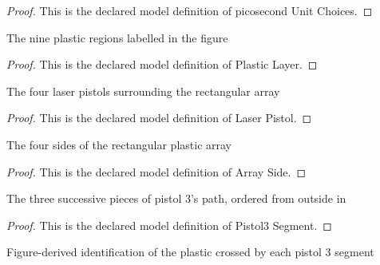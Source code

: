 \begin{proof}
  This is the declared model definition of picosecond Unit Choices.
\end{proof}
\begin{definition}
  \label{def:physics:phyx-mini-0085:phyxminiproblems-problemphyxmini0085-plasticlayer}
  The nine plastic regions labelled in the figure
\end{definition}
\begin{proof}
  This is the declared model definition of Plastic Layer.
\end{proof}
\begin{definition}
  \label{def:physics:phyx-mini-0085:phyxminiproblems-problemphyxmini0085-laserpistol}
  The four laser pistols surrounding the rectangular array
\end{definition}
\begin{proof}
  This is the declared model definition of Laser Pistol.
\end{proof}
\begin{definition}
  \label{def:physics:phyx-mini-0085:phyxminiproblems-problemphyxmini0085-arrayside}
  The four sides of the rectangular plastic array
\end{definition}
\begin{proof}
  This is the declared model definition of Array Side.
\end{proof}
\begin{definition}
  \label{def:physics:phyx-mini-0085:phyxminiproblems-problemphyxmini0085-pistol3segment}
  The three successive pieces of pistol 3's path, ordered from outside in
\end{definition}
\begin{proof}
  This is the declared model definition of Pistol3 Segment.
\end{proof}
\begin{definition}[layer]
  \label{def:physics:phyx-mini-0085:phyxminiproblems-problemphyxmini0085-pistol3segment-layer}
  Figure-derived identification of the plastic crossed by each pistol 3 segment
\end{definition}

